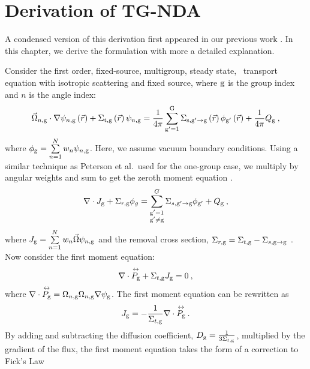 
\section{Derivation of TG-NDA}
A condensed version of this derivation first appeared in our previous work \cite{Ramirez2017}. In this chapter, we derive the formulation with more a detailed explanation.

Consider the first order, fixed-source, multigroup, steady state, \sn\ transport equation with isotropic scattering and fixed source, where $\mathrm{g}$ is the group index and $n$ is the angle index:
  \begin{equation}
  \vec{\Omega}_{n,\mathrm{g}}\cdot \nabla \psi_{n,\mathrm{g}} \left(\vec{r}\right)+ \Sigma_{\mathrm{t},\mathrm{g}}\left(\vec{r}\right)\psi_{n,\mathrm{g}} = \frac{1}{4 \pi} \sum\limits_{\mathrm{g}'=1}^{\mathrm{G}} \Sigma_{\mathrm{s},{\mathrm{g}'}\to\mathrm{g}}\left(\vec{r}\right) \phi_{\mathrm{g}'}\left(\vec{r}\right) + \frac{1}{4 \pi} Q_{\mathrm{g}}\:,
  \end{equation}
where $\phi_{\mathrm{g}} = \sum\limits_{n=1}^N w_n \psi_{n, \mathrm{g}}$. Here, we assume vacuum boundary conditions. 
Using a similar technique as Peterson et al.\ used for the one-group case, we multiply by angular weights and sum to get the zeroth moment equation \cite{morel-holo}.
%
  \begin{equation}
  \nabla \cdot J_{\mathrm{g}} + \Sigma_{r,\mathrm{g}}\phi_g  = \sum_{\substack{\mathrm{g}'=1 \\ \mathrm{g}' \neq \mathrm{g}}}^G \Sigma_{s,\mathrm{g}' \rightarrow \mathrm{g}}\phi_{\mathrm{g}'} + Q_{\mathrm{g}}\:,
  \label{eq:zeroth_moment}
  \end{equation}
where $J_{\mathrm{g}} = \sum\limits_{n=1}^{N}w_n \vec{\Omega}\psi_{n, \mathrm{g}}$ and the removal cross section, $\Sigma_{r, \mathrm{g}} = \Sigma_{t, \mathrm{g}} - \Sigma_{s, \mathrm{g} \rightarrow \mathrm{g}}$ . 
  Now consider the first moment equation:
  \begin{equation}
  \nabla \cdot \overset{\text{\scriptsize$\leftrightarrow$}}{P_{\mathrm{g}}} + \Sigma_{t, \mathrm{g}} J_{\mathrm{g}} = 0\:,
  \end{equation}
where $\nabla \cdot \overset{\text{\scriptsize$\leftrightarrow$}}{P_{\mathrm{g}}} =  \Omega_{n,\mathrm{g}} \Omega_{n,\mathrm{g}} \nabla \psi_{\mathrm{g}}$. The first moment equation can be rewritten as
%
  \begin{equation}
  J_{\mathrm{g}} = -\frac{1}{\Sigma_{t, \mathrm{g}}} \nabla \cdot \overset{\text{\scriptsize$\leftrightarrow$}}{P_{\mathrm{g}}} \:. 
  \end{equation}
  By adding and subtracting the diffusion coefficient, $D_{\mathrm{g}} = \frac{1}{3\Sigma_{t, \mathrm{g}}}$, multiplied by the gradient of the flux, the first moment equation takes the form of a correction to Fick's Law
